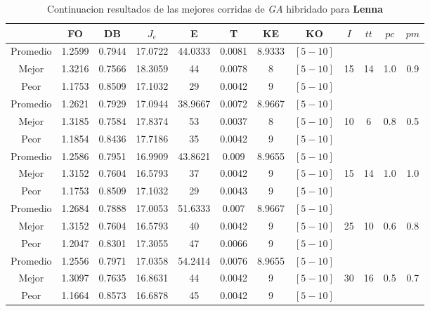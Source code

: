 \begin{table}[h!]
    \footnotesize
    \begin{center}
        \begin{tabular}{|c|c|c|c|c|c|c|c|c|c|c|c|}
        \hline
            & {\bf FO} & {\bf DB} & $J_e$ & {\bf E} & {\bf T} & {\bf KE} & {\bf KO} & $I$ & $tt$ & $pc$ & $pm$ \\
        \hline
        \hline
            Promedio  & 1.2599 & 0.7944 & 17.0722 & 44.0333 & 0.0081 & 8.9333 & $[5-10]$ &  &  &  & \\
            \cline{1-8}
            Mejor & 1.3216 & 0.7566  & 18.3059 & 44 & 0.0078 & 8 & $[5-10]$ & 15 & 14 & 1.0 & 0.9\\
            \cline{1-8}
            Peor & 1.1753 & 0.8509  & 17.1032 & 29 & 0.0042 & 9 & $[5-10]$ &  &  &  & \\
        \hline
        \hline
            Promedio  & 1.2621 & 0.7929 & 17.0944 & 38.9667 & 0.0072 & 8.9667 & $[5-10]$ &  &  &  & \\
            \cline{1-8}
            Mejor & 1.3185 & 0.7584  & 17.8374 & 53 & 0.0037 & 8 & $[5-10]$ & 10 & 6 & 0.8 & 0.5\\
            \cline{1-8}
            Peor & 1.1854 & 0.8436  & 17.7186 & 35 & 0.0042 & 9 & $[5-10]$ &  &  &  & \\
        \hline
        \hline
            Promedio  & 1.2586 & 0.7951 & 16.9909 & 43.8621 & 0.009 & 8.9655 & $[5-10]$ &  &  &  & \\
            \cline{1-8}
            Mejor & 1.3152 & 0.7604  & 16.5793 & 37 & 0.0042 & 9 & $[5-10]$ & 15 & 14 & 1.0 & 1.0\\
            \cline{1-8}
            Peor & 1.1753 & 0.8509  & 17.1032 & 29 & 0.0043 & 9 & $[5-10]$ &  &  &  & \\
        \hline
        \hline
            Promedio  & 1.2684 & 0.7888 & 17.0053 & 51.6333 & 0.007 & 8.9667 & $[5-10]$ &  &  &  & \\
            \cline{1-8}
            Mejor & 1.3152 & 0.7604  & 16.5793 & 40 & 0.0042 & 9 & $[5-10]$ & 25 & 10 & 0.6 & 0.8\\
            \cline{1-8}
            Peor & 1.2047 & 0.8301  & 17.3055 & 47 & 0.0066 & 9 & $[5-10]$ &  &  &  & \\
        \hline
        \hline
            Promedio  & 1.2556 & 0.7971 & 17.0358 & 54.2414 & 0.0076 & 8.9655 & $[5-10]$ &  &  &  & \\
            \cline{1-8}
            Mejor & 1.3097 & 0.7635  & 16.8631 & 44 & 0.0042 & 9 & $[5-10]$ & 30 & 16 & 0.5 & 0.7\\
            \cline{1-8}
            Peor & 1.1664 & 0.8573  & 16.6878 & 45 & 0.0042 & 9 & $[5-10]$ &  &  &  & \\
        \hline
        \end{tabular}
        \caption{Continuacion resultados de las mejores corridas de \emph{GA} hibridado para {\bf Lenna}}
        \label{tb:tablegahibimgc}
    \end{center}
\end{table}
